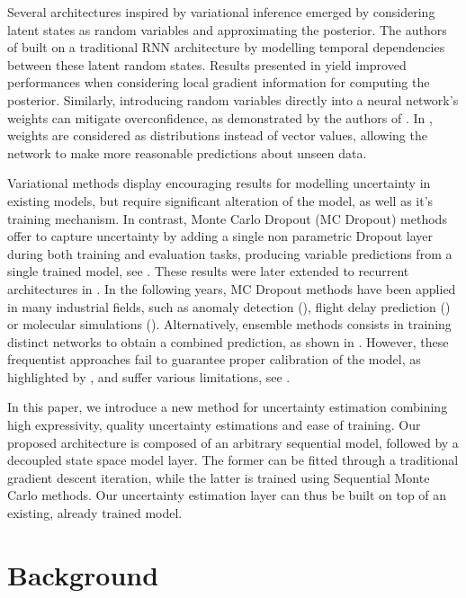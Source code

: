 \documentclass{article}
\begin{document}
Several architectures inspired by variational inference emerged by considering latent states as random variables and approximating the posterior.
The authors of \cite{Chung2015NIPS} built on a traditional RNN architecture by modelling temporal dependencies between these latent random states.
Results presented in \cite{Fortunato2017bayesian} yield improved performances when considering local gradient information for computing the posterior.
Similarly, introducing random variables directly into a neural network's weights can mitigate overconfidence, as demonstrated by the authors of \cite{Hinton1993}.
In \cite{Blundell2015}, weights are considered as distributions instead of vector values, allowing the network to make more reasonable predictions about unseen data.

Variational methods display encouraging results for modelling uncertainty in existing models, but require significant alteration of the model, as well as it's training mechanism.
In contrast, Monte Carlo Dropout (MC Dropout) methods offer to capture uncertainty by adding a single non parametric Dropout layer during both training and evaluation tasks, producing variable predictions from a single trained model, see \cite{Gal2016}.
These results were later extended to recurrent architectures in \cite{Gal2016NIPS}.
In the following years, MC Dropout methods have been applied in many industrial fields, such as anomaly detection (\cite{Zhu2017DeepAC}), flight delay prediction (\cite{Vandal2018}) or molecular simulations (\cite{Wen2020UncertaintyQI}).
Alternatively, ensemble methods consists in training distinct networks to obtain a combined prediction, as shown in \cite{Pearce2018}.
However, these frequentist approaches fail to guarantee proper calibration of the model, as highlighted by \cite{ashukha2020pitfalls}, and suffer various limitations, see \cite{Fong2020}.

In this paper, we introduce a new method for uncertainty estimation combining high expressivity, quality uncertainty estimations and ease of training.
Our proposed architecture is composed of an arbitrary sequential model, followed by a decoupled state space model layer.
The former can be fitted through a traditional gradient descent iteration, while the latter is trained using Sequential Monte Carlo methods.
Our uncertainty estimation layer can thus be built on top of an existing, already trained model.

\section{Background}
\label{sec:background}
\end{document}
